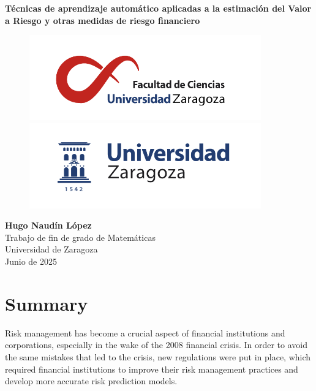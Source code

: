 \documentclass[11pt]{book}
\newcommand{\clearemptydoublepage}{\newpage{\pagestyle{empty}\cleardoublepage}}
\theoremstyle{plain} %
\theoremstyle{definition} %
\begin{document}
\frontmatter                     %
\pagestyle{primeraparte}    %


\begin{titlepage}
\begin{center}

\null
\vfill

\Huge{\bfseries Técnicas de aprendizaje automático aplicadas a la estimación del Valor a Riesgo y otras medidas de riesgo financiero}

\vfill

\noindent
\begin{figure}[h]
\centering
\includegraphics[width=100mm]{ciencias.png}\\%
\includegraphics[width=100mm]{logoUZ.png}
\end{figure}

\vfill

\Huge{\bfseries Hugo Naudín López}\\%
\Huge{Trabajo de fin de grado de Matemáticas}\\%
\Huge{Universidad de Zaragoza}\\%

\vfill
\huge{Junio de 2025}
\end{center}
\end{titlepage}

\clearemptydoublepage


\chapter{Summary}
Risk management has become a crucial aspect of financial institutions 
and corporations, especially in the wake of the 2008 financial crisis. In 
order to avoid the same mistakes that led to the crisis, new regulations 
were put in place, which required financial institutions to improve their risk
management practices and develop more accurate risk prediction models.\\
\end{document}
